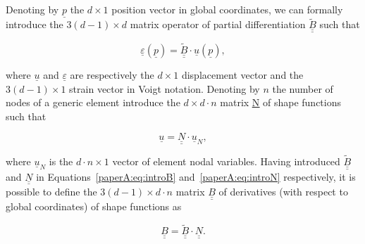 
Denoting  by $\underline{p}$ the $d\times 1$ position vector in global coordinates, we can formally introduce the $3\left(d-1\right)\times d$ matrix operator of partial differentiation $\underline{\underline{\widetilde{B}}}$ such that

\begin{equation}\label{paperA:eq:introB}
\underline{\varepsilon}\left(\underline{p}\right)=\underline{\underline{\widetilde{B}}}\cdot\underline{u}\left(\underline{p}\right),
\end{equation}

where $\underline{u}$ and $\underline{\varepsilon}$ are respectively the $d\times 1$ displacement vector and the $3\left(d-1\right)\times 1$ strain vector in Voigt notation. Denoting by $n$ the number of nodes of a generic element  introduce the $d\times d\cdot n$ matrix \underline{\underline{N}} of shape functions such that

\begin{equation}\label{paperA:eq:introN}
\underline{u}=\underline{\underline{N}}\cdot\underline{u}_{N},
\end{equation}

where $\underline{u}_{N}$ is the $d\cdot n\times 1$ vector of element nodal variables. Having introduced $\underline{\underline{\widetilde{B}}}$ and $\underline{\underline{N}}$ in Equations~\ref{paperA:eq:introB} and~\ref{paperA:eq:introN} respectively, it is possible to define the $3\left(d-1\right)\times d\cdot n$ matrix $\underline{\underline{B}}$ of derivatives (with respect to global coordinates) of shape functions as

\begin{equation}
\underline{\underline{B}}=\underline{\underline{\widetilde{B}}}\cdot\underline{\underline{N}}.
\end{equation}

